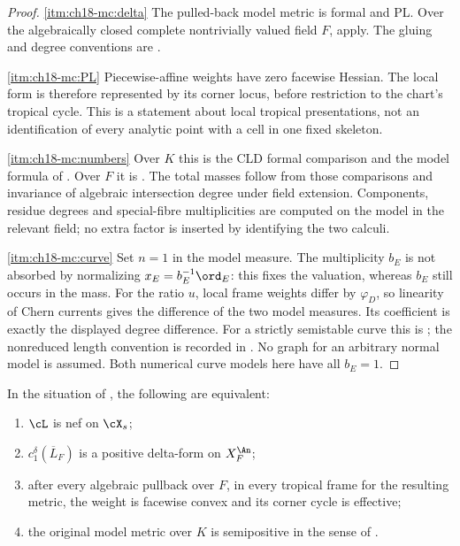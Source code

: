 \begin{proof}
\cref{itm:ch18-mc:delta} The pulled-back model metric is formal and PL.
Over the algebraically closed complete nontrivially valued field $F$,
\cite[Proposition~8.11 and \S9.13]{GK17} apply.  The gluing and degree
conventions are .

\cref{itm:ch18-mc:PL} Piecewise-affine weights have zero facewise Hessian.
The local form is therefore represented by its corner locus, before
restriction to the chart's tropical cycle.  This is a statement about local
tropical presentations, not an identification of every analytic point with
a cell in one fixed skeleton.

\cref{itm:ch18-mc:numbers} Over $K$ this is the CLD formal comparison
 and the model formula of
.  Over $F$ it is
.  The total masses follow from those
comparisons and invariance of algebraic intersection degree under field
extension.  Components, residue degrees and special-fibre multiplicities
are computed on the model in the relevant field; no extra factor is inserted
by identifying the two calculi.

\cref{itm:ch18-mc:curve} Set $n=1$ in the model measure.  The multiplicity
$b_E$ is not absorbed by normalizing $x_E=b_E^{-1}\ord_E$: this fixes the
valuation, whereas $b_E$ still occurs in the mass.  For the ratio $u$, local
frame weights differ by $\varphi_D$, so linearity of Chern currents gives
the difference of the two model measures.  Its coefficient is exactly the
displayed degree difference.  For a strictly semistable curve this is
; the nonreduced length convention is
recorded in .  No graph for an
arbitrary normal model is assumed.  Both numerical curve models here have
all $b_E=1$.
\end{proof}

\begin{corollary}
\label{cor:ch18-model-psh}
In the situation of , the following are
equivalent:
\begin{enumerate}
\item $\cL$ is nef on $\cX_s$;
\item $c_1^\delta(\overline L_F)$ is a positive delta-form on $X_F^{\An}$;
\item after every algebraic pullback over $F$, in every tropical frame for
 the resulting metric, the weight is facewise convex and its corner cycle
 is effective;
\item the original model metric over $K$ is semipositive in the sense of
 .
\end{enumerate}
\end{corollary}

